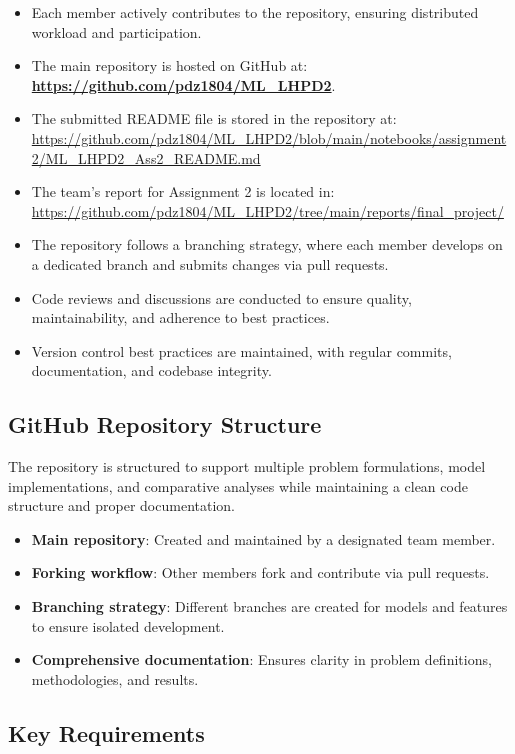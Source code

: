 \begin{itemize}
    \item Each member actively contributes to the repository, ensuring distributed workload and participation.
    \item The main repository is hosted on GitHub at:  
    \textbf{\url{https://github.com/pdz1804/ML_LHPD2}}.
    \item The submitted README file is stored in the repository at: \url{https://github.com/pdz1804/ML_LHPD2/blob/main/notebooks/assignment2/ML_LHPD2_Ass2_README.md}
    \item The team's report for Assignment 2 is located in: \url{https://github.com/pdz1804/ML_LHPD2/tree/main/reports/final_project/}
    \item The repository follows a branching strategy, where each member develops on a dedicated branch and submits changes via pull requests.
    \item Code reviews and discussions are conducted to ensure quality, maintainability, and adherence to best practices.
    \item Version control best practices are maintained, with regular commits, documentation, and codebase integrity.
\end{itemize}

\subsection{GitHub Repository Structure}

The repository is structured to support multiple problem formulations, model implementations, and comparative analyses while maintaining a clean code structure and proper documentation.

\begin{itemize}
    \item \textbf{Main repository}: Created and maintained by a designated team member.
    \item \textbf{Forking workflow}: Other members fork and contribute via pull requests.
    \item \textbf{Branching strategy}: Different branches are created for models and features to ensure isolated development.
    \item \textbf{Comprehensive documentation}: Ensures clarity in problem definitions, methodologies, and results.
\end{itemize}

\subsection{Key Requirements}

